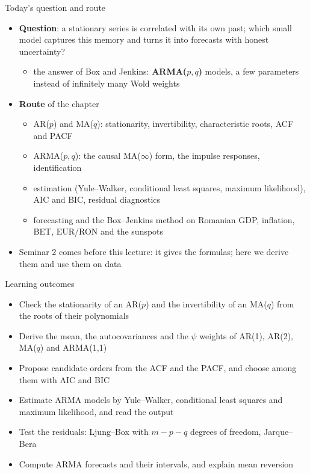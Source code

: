 \begin{frame}{Today's question and route}
\itemsize{\small}
\begin{itemize}
    \item \textbf{Question}: a stationary series is correlated with its own past; which small model captures this memory and turns it into forecasts with honest uncertainty?
    \begin{itemize}
        \item the answer of Box and Jenkins: \textbf{ARMA($p,q$)} models, a few parameters instead of infinitely many Wold weights
    \end{itemize}
    \item \textbf{Route} of the chapter
    \begin{itemize}
        \item AR($p$) and MA($q$): stationarity, invertibility, characteristic roots, ACF and PACF
        \item ARMA($p,q$): the causal MA($\infty$) form, the impulse responses, identification
        \item estimation (Yule--Walker, conditional least squares, maximum likelihood), AIC and BIC, residual diagnostics
        \item forecasting and the Box--Jenkins method on Romanian GDP, inflation, BET, EUR/RON and the sunspots
    \end{itemize}
    \item Seminar 2 comes before this lecture: it gives the formulas; here we derive them and use them on data
\end{itemize}
\end{frame}

\begin{frame}{Learning outcomes}
\itemsize{\small}
\begin{itemize}
    \item Check the stationarity of an AR($p$) and the invertibility of an MA($q$) from the roots of their polynomials
    \item Derive the mean, the autocovariances and the $\psi$ weights of AR(1), AR(2), MA($q$) and ARMA(1,1)
    \item Propose candidate orders from the ACF and the PACF, and choose among them with AIC and BIC
    \item Estimate ARMA models by Yule--Walker, conditional least squares and maximum likelihood, and read the output
    \item Test the residuals: Ljung--Box with $m - p - q$ degrees of freedom, Jarque--Bera
    \item Compute ARMA forecasts and their intervals, and explain mean reversion
\end{itemize}
\end{frame}

